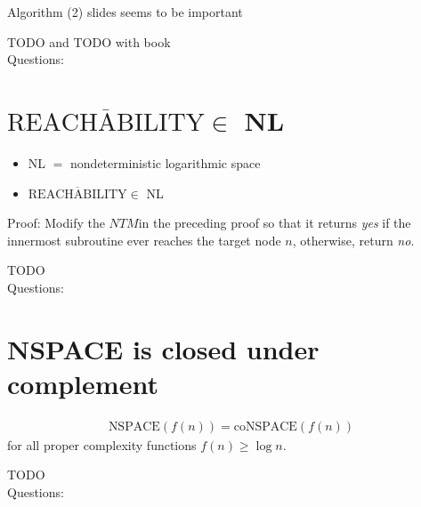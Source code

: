\documentclass[a4]{scrartcl}
\begin{document}
Algorithm (2) slides seems to be important

\color{red} TODO and TODO with book \\
\color{black}
\color{violet} Questions:
\color{black}




\section*{$\overline{\text{REACHABILITY}} \in$ NL}

\begin{itemize}
\item NL $=$ nondeterministic logarithmic space
\item $\overline{\text{REACHABILITY}} \in$ NL
\end{itemize}



Proof: Modify the $NTM $in the preceding proof so that it returns \textit{yes} if the innermost subroutine ever reaches the target node $n$, otherwise, return \textit{no}.

\color{red} TODO \\
\color{black}
\color{violet} Questions:
\color{black}



\section*{NSPACE is closed under complement}

\begin{align*}
\text{NSPACE}(f(n)) = \text{coNSPACE}(f(n))
\end{align*}
for all proper complexity functions $f(n) \geq \log n$.


\color{red} TODO \\
\color{black}
\color{violet} Questions:
\color{black}




\newpage

\printbibliography
\end{document}
